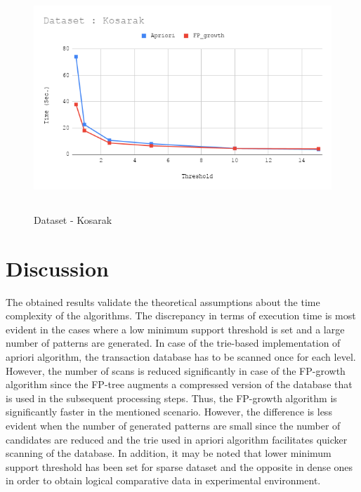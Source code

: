 \documentclass[12pt]{article}
\begin{document}
\begin{figure}[H]
	\centering
	\includegraphics[width = 0.95\columnwidth, height = 8.5cm]{Kosarak.png}
	\caption{Dataset - Kosarak}
	\label{fig:kosarak}
\end{figure}

\section{Discussion}
The obtained results validate the theoretical assumptions about the time complexity of the algorithms. The discrepancy in terms of execution time is most evident in the cases where a low minimum support threshold is set and a large number of patterns are generated. In case of the trie-based implementation of apriori algorithm, the transaction database has to be scanned once for each level. However, the number of scans is reduced significantly in case of the FP-growth algorithm since the FP-tree augments a compressed version of the database that is used in the subsequent processing steps. Thus, the FP-growth algorithm is significantly faster in the mentioned scenario.
However, the difference is less evident when the number of generated patterns are small since the number of candidates are reduced and the trie used in apriori algorithm facilitates quicker scanning of the database. In addition, it may be noted that lower minimum support threshold has been set for sparse dataset and the opposite in dense ones in order to obtain logical comparative data in experimental environment.  
\end{document}

